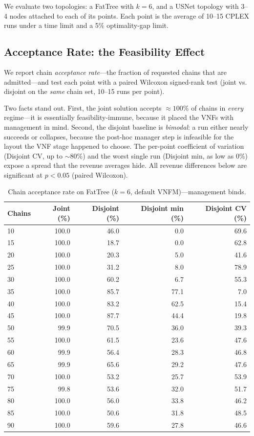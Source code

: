 We evaluate two topologies: a FatTree with \(k = 6\), and a USNet topology with
3--4 nodes attached to each of its points. Each point is the average of 10--15
CPLEX runs under a time limit and a 5\% optimality-gap limit.

\subsection{Acceptance Rate: the Feasibility Effect}\label{sec:acceptance}

We report chain \emph{acceptance rate}---the fraction of requested chains that
are admitted---and test each point with a paired Wilcoxon signed-rank test (joint
vs. disjoint on the \emph{same} chain set, 10--15 runs per point).

Two facts stand out. First, the joint solution accepts \(\approx 100\%\) of
chains in \emph{every} regime---it is essentially feasibility-immune, because it
placed the VNFs with management in mind. Second, the disjoint baseline is
\emph{bimodal}: a run either nearly succeeds or collapses, because the post-hoc
manager step is infeasible for the layout the VNF stage happened to choose. The
per-point coefficient of variation (Disjoint CV, up to \(\sim\)80\%) and the
worst single run (Disjoint min, as low as 0\%) expose a spread that the revenue
averages hide. All revenue differences below are significant at \(p < 0.05\)
(paired Wilcoxon).

\begin{table}[H]
\caption{Chain acceptance rate on FatTree (\(k = 6\), default VNFM)---management
binds.}
\label{tbl:acceptance-fattree}
\begin{tabularx}{\textwidth}{Xrrrr}
\toprule
\textbf{Chains} & \textbf{Joint (\%)} & \textbf{Disjoint (\%)} & \textbf{Disjoint min (\%)} & \textbf{Disjoint CV (\%)} \\
\midrule
10 & 100.0 & 46.0 & 0.0 & 69.6 \\
15 & 100.0 & 18.7 & 0.0 & 62.8 \\
20 & 100.0 & 20.3 & 5.0 & 41.6 \\
25 & 100.0 & 31.2 & 8.0 & 78.9 \\
30 & 100.0 & 60.2 & 6.7 & 55.3 \\
35 & 100.0 & 85.7 & 77.1 & 7.0 \\
40 & 100.0 & 83.2 & 62.5 & 15.4 \\
45 & 100.0 & 87.7 & 44.4 & 19.8 \\
50 & 99.9 & 70.5 & 36.0 & 39.3 \\
55 & 100.0 & 61.5 & 23.6 & 47.6 \\
60 & 99.9 & 56.4 & 28.3 & 46.8 \\
65 & 99.9 & 65.6 & 29.2 & 47.6 \\
70 & 100.0 & 53.2 & 25.7 & 53.9 \\
75 & 99.8 & 53.6 & 32.0 & 51.7 \\
80 & 100.0 & 56.0 & 33.8 & 46.2 \\
85 & 100.0 & 50.6 & 31.8 & 48.5 \\
90 & 100.0 & 59.6 & 27.8 & 46.6 \\
\bottomrule
\end{tabularx}
\end{table}

